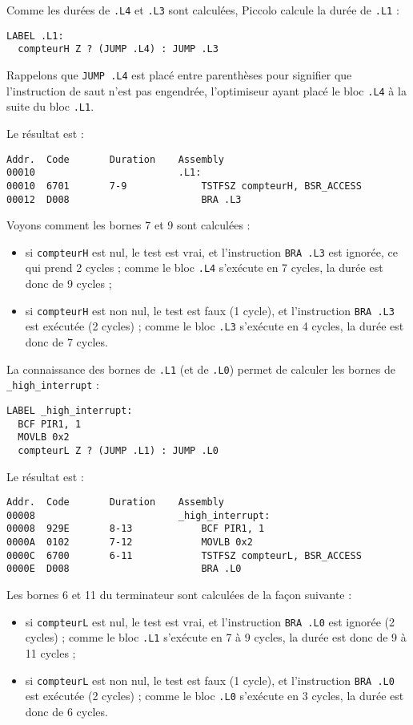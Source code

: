Comme les durées de \texttt{.L4} et \texttt{.L3} sont calculées, Piccolo calcule la durée de \texttt{.L1} :
\begin{lstlisting}[language=assembleur]
LABEL .L1:
  compteurH Z ? (JUMP .L4) : JUMP .L3
\end{lstlisting}

Rappelons que \texttt{JUMP .L4} est placé entre parenthèses pour signifier que l'instruction de saut n'est pas engendrée, l'optimiseur ayant placé le bloc \texttt{.L4} à la suite du bloc \texttt{.L1}.

Le résultat est :
\begin{lstlisting}[language=assembleur]
Addr.  Code       Duration    Assembly
00010                         .L1:
00010  6701       7-9             TSTFSZ compteurH, BSR_ACCESS
00012  D008                       BRA .L3
\end{lstlisting}

Voyons comment les bornes 7 et 9 sont calculées :
\begin{itemize}
\item si \texttt{compteurH} est nul, le test est vrai, et l'instruction \texttt{BRA .L3} est ignorée, ce qui prend 2 cycles ; comme le bloc \texttt{.L4} s'exécute en 7 cycles, la durée est donc de 9 cycles ;
\item si \texttt{compteurH} est non nul, le test est faux (1 cycle), et l'instruction \texttt{BRA .L3} est exécutée (2 cycles) ; comme le bloc \texttt{.L3} s'exécute en 4 cycles, la durée est donc de 7 cycles.
\end{itemize}

La connaissance des bornes de \texttt{.L1} (et de \texttt{.L0}) permet de calculer les bornes de \texttt{\_high\_interrupt} :
\begin{lstlisting}[language=assembleur]
LABEL _high_interrupt:
  BCF PIR1, 1
  MOVLB 0x2
  compteurL Z ? (JUMP .L1) : JUMP .L0
\end{lstlisting}

Le résultat est :
\begin{lstlisting}[language=assembleur]
Addr.  Code       Duration    Assembly
00008                         _high_interrupt:
00008  929E       8-13            BCF PIR1, 1
0000A  0102       7-12            MOVLB 0x2
0000C  6700       6-11            TSTFSZ compteurL, BSR_ACCESS
0000E  D008                       BRA .L0
\end{lstlisting}

Les bornes 6 et 11 du terminateur sont calculées de la façon suivante :
\begin{itemize}
\item si \texttt{compteurL} est nul, le test est vrai, et l'instruction \texttt{BRA .L0} est ignorée (2 cycles) ; comme le bloc \texttt{.L1} s'exécute en 7 à 9 cycles, la durée est donc de 9 à 11 cycles ;
\item si \texttt{compteurL} est non nul, le test est faux (1 cycle), et l'instruction \texttt{BRA .L0} est exécutée (2 cycles) ; comme le bloc \texttt{.L0} s'exécute en 3 cycles, la durée est donc de 6 cycles.
\end{itemize}


